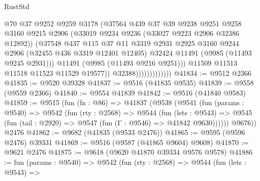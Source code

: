 \begin{lexlean}{RustStd}
\begin{coremodule}
                                  @70
                                  @37
                                  @9252
                                  @9259
                                  @3178
                                  (@37564
                                    @439
                                    @37
                                    @39
                                    @9238
                                    @9251
                                    @9258
                                    @3160
                                    @9215
                                    @2906
                                    (@33019 @9234 @9236 (@33027 @9223 @2906 @32386 @12892))
                                    (@37548
                                      @437
                                      @115
                                      @37
                                      @11
                                      @3319
                                      @2931
                                      @2925
                                      @3160
                                      @9244
                                      @2906
                                      (@32455 @436 @3319 @12401 @12405)
                                      @32424
                                      @11491
                                      (@9985 (@11493 @9245 @2931)))
                                    @11491
                                    (@9985 (@11493 @9216 @9251)))
                                  @11509
                                  @11513
                                  @11518
                                  @11523
                                  @11529
                                  @19577))
                              @32388)))))))))))))
@41834 := @9512 @2366
@41835 := @9520 @39328
@41837 := @9516 (@41835 @9535)
@41839 := @9558 (@9559 @2366)
@41840 := @9554 @41839
@41842 := @9516 (@41840 @9583)
@41859 := @9515
    (fun (fn : @86) =>
    @41837
      (@9538
        (@9541
          (fun (params : @9540) =>
          @9542
            (fun (rty : @2568) =>
            @9544
              (fun (lets : @9543) =>
              @9545 (fun (tail : @2920) => @9547 (fun (Γ : @9546) => @41842 @9630))))))
        @9676))
    @2476
@41862 := @9682 (@41835 (@9533 @2476))
@41865 := @9595 (@9596 @2476) @39331
@41869 := @9516 (@9587 (@41865 @9604) @9608)
@41870 := @9621 @2476
@41875 := @9618 (@9620 @41870 @39334 @9576 @9578)
@41886 := fun (params : @9540) =>
  @9542
    (fun (rty : @2568) =>
    @9544
      (fun (lets : @9543) =>

\end{coremodule}
\end{lexlean}
